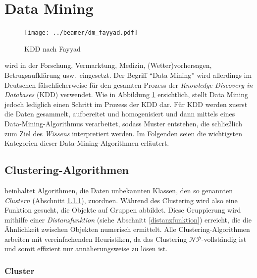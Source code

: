 \documentclass[12pt,journal,compsoc]{IEEEtran}
\begin{document}
\section{Data Mining}

\begin{figure}[!b]
  \centering
  \texttt{[image: ../beamer/dm\_fayyad.pdf]}
  \caption{KDD nach Fayyad \cite{fayyad1996data}}
  \label{kdd}
  \end{figure}
  
 wird in der Forschung, Vermarktung, Medizin, (Wetter)vorhersagen, Betrugsaufklärung usw.~eingesetzt. Der Begriff \enquote{Data Mining} wird allerdings im Deutschen fälschlicherweise für den gesamten Prozess der \emph{Knowledge Discovery in Databases} (KDD) verwendet. Wie in Abbildung \ref{kdd} ersichtlich, stellt Data Mining jedoch lediglich einen Schritt im Prozess der KDD dar. Für KDD werden zuerst die Daten gesammelt, aufbereitet und homogenisiert und dann mittels eines Data-Mining-Algorithmus verarbeitet, sodass Muster entstehen, die schließlich zum Ziel des \emph{Wissens} interpretiert werden. Im Folgenden seien die wichtigsten Kategorien dieser Data-Mining-Algorithmen erläutert.
 
\subsection{Clustering-Algorithmen}

 beinhaltet Algorithmen, die Daten unbekannten Klassen, den so genannten \emph{Clustern} (Abschnitt \ref{cluster}), zuordnen. Während des Clustering wird also eine Funktion gesucht, die Objekte auf Gruppen abbildet. Diese Gruppierung wird mithilfe
einer \emph{Distanzfunktion} (siehe Abschnitt \ref{distanzfunktion}) erreicht, die die Ähnlichkeit zwischen Objekten numerisch ermittelt.
Alle Clustering-Algorithmen arbeiten mit vereinfachenden Heuristiken, da das Clustering $\mathcal{NP}$-vollständig ist und somit effizient nur annäherungsweise zu lösen ist.

\subsubsection{Cluster} \label{cluster}
\end{document}

